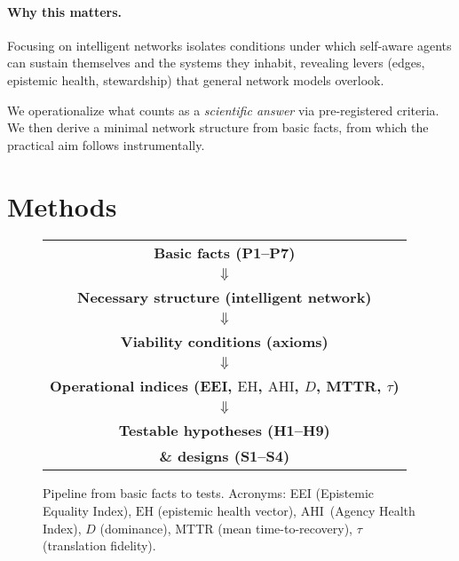 \documentclass[12pt]{article}
\newcommand{\EH}{\ensuremath{\mathrm{EH}}}
\newcommand{\AHI}{\ensuremath{\mathrm{AHI}}}
\begin{document}
\paragraph{Why this matters.}
Focusing on intelligent networks isolates conditions under which self-aware agents can sustain themselves and the systems they inhabit, revealing levers (edges, epistemic health, stewardship) that general network models overlook.

\smallskip
We operationalize what counts as a \emph{scientific answer} via pre-registered criteria. We then derive a minimal network structure from basic facts, from which the practical aim follows instrumentally.

\section{Methods}

\begin{figure}[h]
\centering
\begin{tabular}{c}
\large \textbf{Basic facts (P1--P7)} \\
$\Downarrow$ \\
\large \textbf{Necessary structure (intelligent network)} \\
$\Downarrow$ \\
\large \textbf{Viability conditions (axioms)} \\
$\Downarrow$ \\
\large \textbf{Operational indices (EEI, $\EH$, \AHI, $D$, MTTR, $\tau$)} \\
$\Downarrow$ \\
\large \textbf{Testable hypotheses (H1--H9)} \\ \textbf{\& designs (S1--S4)}
\end{tabular}

\caption{Pipeline from basic facts to tests. Acronyms: EEI (Epistemic Equality Index), $\EH$ (epistemic health vector), \AHI\ (Agency Health Index), $D$ (dominance), MTTR (mean time-to-recovery), $\tau$ (translation fidelity).}
\end{figure}
\end{document}

